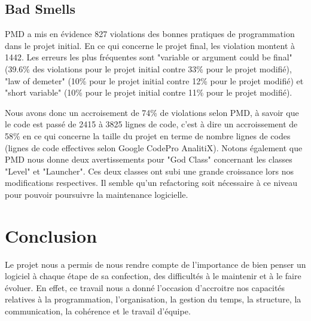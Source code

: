 \documentclass[a4paper,12pt]{report} %
\begin{document}
\subsection{Bad Smells}
PMD a mis en évidence 827 violations des bonnes pratiques de programmation
dans le projet initial. En ce qui concerne le projet final, les violation montent à 1442. Les erreurs les plus fréquentes sont "variable
or argument could be final" (39.6\% des violations pour le projet
initial contre 33\% pour le projet modifié), "law of demeter"
(10\% pour le projet initial contre 12\% pour le projet modifié) et
"short variable" (10\% pour le projet initial contre 11\% pour
le projet modifié).

Nous avons donc un accroisement de 74\% de violations selon PMD, à savoir
que le code est passé de 2415 à 3825 lignes de code, c'est à dire
un accroissement de 58\% en ce qui concerne la taille du projet en terme de nombre
lignes de codes (lignes de code effectives selon Google CodePro AnalitiX).
Notons également que PMD nous donne deux avertissements pour "God Class"
concernant les classes "Level" et "Launcher". Ces deux classes ont subi une grande croissance lors nos
modifications respectives. Il semble qu'un refactoring soit nécessaire
à ce niveau pour pouvoir poursuivre la maintenance logicielle.

\section{Conclusion}
Le projet nous a permis de nous rendre compte de l'importance de bien penser un logiciel à chaque étape de sa confection, des difficultés à le maintenir et à le faire évoluer. En effet, ce travail nous a donné l'occasion d'accroitre nos capacités relatives à la programmation, l'organisation, la gestion du temps, la structure, la communication, la cohérence et le travail d'équipe.
\end{document}
